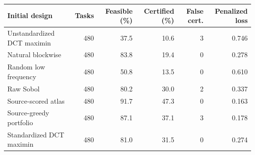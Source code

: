 \begin{tabular}{lrrrrr}
\toprule
Initial design & Tasks & Feasible (\%) & Certified (\%) & False cert. & Penalized loss \\
\midrule
Unstandardized DCT maximin & 480 & 37.5 & 10.6 & 3 & 0.746 \\
Natural blockwise & 480 & 83.8 & 19.4 & 0 & 0.278 \\
Random low frequency & 480 & 50.8 & 13.5 & 0 & 0.610 \\
Raw Sobol & 480 & 80.2 & 30.0 & 2 & 0.337 \\
Source-scored atlas & 480 & 91.7 & 47.3 & 0 & 0.163 \\
Source-greedy portfolio & 480 & 87.1 & 37.1 & 3 & 0.178 \\
Standardized DCT maximin & 480 & 81.0 & 31.5 & 0 & 0.274 \\
\bottomrule
\end{tabular}
